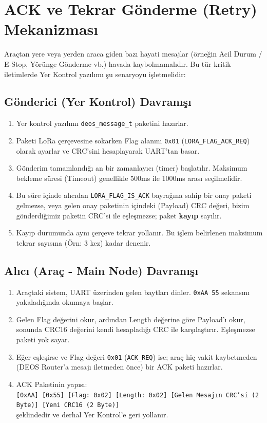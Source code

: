 \documentclass[a4paper,10pt]{article}
\newcommand{\hex}[1]{\texttt{0x#1}}
\newcommand{\code}[1]{\texttt{#1}}
\begin{document}
\section{ACK ve Tekrar Gönderme (Retry) Mekanizması}
Araçtan yere veya yerden araca giden bazı hayati mesajlar (örneğin Acil Durum / E-Stop, Yörünge Gönderme vb.) havada kaybolmamalıdır. Bu tür kritik iletimlerde Yer Kontrol yazılımı şu senaryoyu işletmelidir:

\subsection{Gönderici (Yer Kontrol) Davranışı}
\begin{enumerate}
    \item Yer kontrol yazılımı \code{deos\_message\_t} paketini hazırlar.
    \item Paketi LoRa çerçevesine sokarken Flag alanını \hex{01} (\code{LORA\_FLAG\_ACK\_REQ}) olarak ayarlar ve CRC'sini hesaplayarak UART'tan basar.
    \item Gönderim tamamlandığı an bir zamanlayıcı (timer) başlatılır. Maksimum bekleme süresi (Timeout) genellikle 500ms ile 1000ms arası seçilmelidir.
    \item Bu süre içinde alıcıdan \code{LORA\_FLAG\_IS\_ACK} bayrağına sahip bir onay paketi gelmezse, veya gelen onay paketinin içindeki (Payload) CRC değeri, bizim gönderdiğimiz paketin CRC'si ile eşleşmezse; paket \textbf{kayıp} sayılır.
    \item Kayıp durumunda aynı çerçeve tekrar yollanır. Bu işlem belirlenen maksimum tekrar sayısına (Örn: 3 kez) kadar denenir.
\end{enumerate}

\subsection{Alıcı (Araç - Main Node) Davranışı}
\begin{enumerate}
    \item Araçtaki sistem, UART üzerinden gelen baytları dinler. \hex{AA 55} sekansını yakaladığında okumaya başlar.
    \item Gelen Flag değerini okur, ardından Length değerine göre Payload'ı okur, sonunda CRC16 değerini kendi hesapladığı CRC ile karşılaştırır. Eşleşmezse paketi yok sayar.
    \item Eğer eşleşirse ve Flag değeri \hex{01} (\code{ACK\_REQ}) ise; araç hiç vakit kaybetmeden (DEOS Router'a mesajı iletmeden önce) bir ACK paketi hazırlar.
    \item ACK Paketinin yapısı: \\ \code{[0xAA] [0x55] [Flag: 0x02] [Length: 0x02] [Gelen Mesajın CRC'si (2 Byte)] [Yeni CRC16 (2 Byte)]} \\ şeklindedir ve derhal Yer Kontrol'e geri yollanır.
\end{enumerate}
\end{document}
